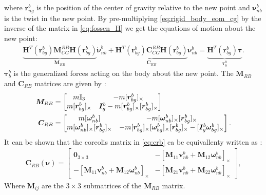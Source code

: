 where $\bm{r}_{ng}^{b}$ is the position of the center of gravity relative to the
new point and $\bm{\nu}_{nb}^{b}$ is the twist in the new point. By
pre-multiplying \autoref{eq:rigid_body_eom_cg} by the inverse of the matrix
in \autoref{eq:fossen_H} we get the equations of motion about the new point:
\begin{align}
    \underbrace{
        \bm{H}^T(\bm{r}_{bg}^b) \bm{M}_{CG}^{RB} \bm{H}(\bm{r}_{bg}^b)
    }_{\bm{M}_{RB}}
    \dot{\bm{\nu}}_{nb}^b
    + \underbrace{
        \bm{H}^T(\bm{r}_{bg}^b) \bm{C}_{CG}^{RB} \bm{H}(\bm{r}_{bg}^b)
    }_{\bm{C}_{RB}}
    \bm{\nu}_{nb}^b
    = \underbrace{
        \bm{H}^T(\bm{r}_{bg}^b)
    \bm{\tau}
    }_{\bm{\tau}_{b}^b}.
\end{align}
$\bm{\tau}_{b}^b$ is the generalized forces acting on the body about the new
point. The $\bm{M}_{RB}$ and $\bm{C}_{RB}$ matrices are given by \cite{fossen2021}:
\begin{subequations}
\begin{align}
    \bm{M}_{RB} &= \begin{bmatrix}
        m \mathbb{I}_3 & - m [\bm{r}_{bg}^b]_{\times} \\
        m [\bm{r}_{bg}^b]_{\times} & \bm{I}_g^b - m [\bm{r}_{bg}^b]_{\times}[\bm{r}_{bg}^b]_{\times}
    \end{bmatrix} \\
    \bm{C}_{RB} &= \begin{bmatrix}
        m [\bm{\omega}_{nb}^b] & -m [\bm{\omega}_{nb}^b]_{\times}[\bm{r}_{bg}^b]_{\times} \\
        m [\bm{\omega}_{nb}^b]_{\times}[\bm{r}_{bg}^b]_{\times} & 
        -m [ \bm{r}_{bg}^b ]_{\times} [ \bm{\omega}_{bg}^b ]_{\times} [ \bm{r}_{bg}^b ]_{\times} -
        [ \bm{I}_g^b \bm{\omega}_{bg}^b ]_{\times}
    \end{bmatrix}. \label{eq:crb}
\end{align}
\end{subequations}
It can be shown that the coreolis matrix in \autoref{eq:crb} ca be equivallenty
written as \cite{sagatun1991}:
\begin{align}
    \bm{C}_{RB}(\bm\nu) = \begin{bmatrix}
        \bm{0}_{3 \times 3} & 
        -\left[\bm{M}_{11}\bm{v}_{nb}^{b} + \bm{M}_{12}\bm{\omega}_{nb}^b \right]_{\times} \\
        -\left[\bm{M}_{11}\bm{v}_{nb}^{b} + \bm{M}_{12}\bm{\omega}_{nb}^b \right]_{\times} &
        -\left[\bm{M}_{21}\bm{v}_{nb}^{b} + \bm{M}_{22}\bm{\omega}_{nb}^b \right]_{\times}
    \end{bmatrix},
\end{align}
Where $\bm{M}_{ij}$ are the $3 \times 3$ submatrices of the $\bm{M}_{RB}$ matrix.

